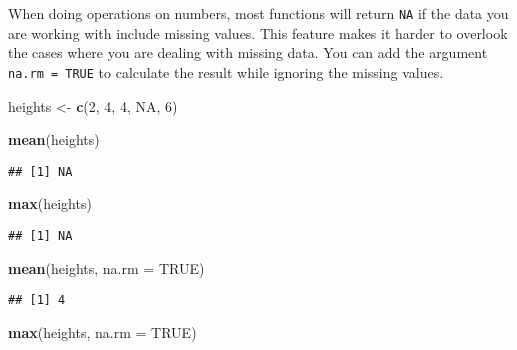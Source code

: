 \documentclass[]{book}
\newenvironment{Shaded}{\begin{snugshade}}{\end{snugshade}}
\newcommand{\DataTypeTok}[1]{\textcolor[rgb]{0.13,0.29,0.53}{#1}}
\newcommand{\DecValTok}[1]{\textcolor[rgb]{0.00,0.00,0.81}{#1}}
\newcommand{\KeywordTok}[1]{\textcolor[rgb]{0.13,0.29,0.53}{\textbf{#1}}}
\newcommand{\NormalTok}[1]{#1}
\newcommand{\OtherTok}[1]{\textcolor[rgb]{0.56,0.35,0.01}{#1}}
\newcommand{\StringTok}[1]{\textcolor[rgb]{0.31,0.60,0.02}{#1}}
\begin{document}
When doing operations on numbers, most functions will return \texttt{NA} if the data you are working with include missing values. This feature makes it harder to overlook the cases where you are dealing with missing data. You can add the argument \texttt{na.rm\ =\ TRUE} to calculate the result while ignoring the missing values.

\begin{Shaded}
\begin{Highlighting}[]
\NormalTok{heights <-}\StringTok{ }\KeywordTok{c}\NormalTok{(}\DecValTok{2}\NormalTok{, }\DecValTok{4}\NormalTok{, }\DecValTok{4}\NormalTok{, }\OtherTok{NA}\NormalTok{, }\DecValTok{6}\NormalTok{)}
\end{Highlighting}
\end{Shaded}

\begin{Shaded}
\begin{Highlighting}[]
\KeywordTok{mean}\NormalTok{(heights)}
\end{Highlighting}
\end{Shaded}

\begin{verbatim}
## [1] NA
\end{verbatim}

\begin{Shaded}
\begin{Highlighting}[]
\KeywordTok{max}\NormalTok{(heights)}
\end{Highlighting}
\end{Shaded}

\begin{verbatim}
## [1] NA
\end{verbatim}

\begin{Shaded}
\begin{Highlighting}[]
\KeywordTok{mean}\NormalTok{(heights, }\DataTypeTok{na.rm =} \OtherTok{TRUE}\NormalTok{)}
\end{Highlighting}
\end{Shaded}

\begin{verbatim}
## [1] 4
\end{verbatim}

\begin{Shaded}
\begin{Highlighting}[]
\KeywordTok{max}\NormalTok{(heights, }\DataTypeTok{na.rm =} \OtherTok{TRUE}\NormalTok{)}
\end{Highlighting}
\end{Shaded}
\end{document}
